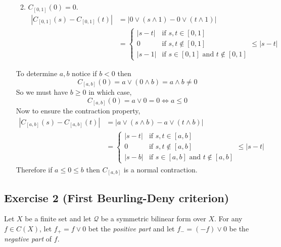 \begin{enumerate}[(a)]
\begin{enumerate}
\begin{equation*}
				\end{equation*}
			\item 
				$C_{[0,1]}(0) = 0$.\\
				\begin{equation*}
					\begin{aligned}
						|C_{[0,1]}(s) - C_{[0,1]}(t)| &= |0\vee(s\wedge 1) - 0\vee(t\wedge 1)|\\
						&=
						\begin{cases}
							|s - t| &\text{if }s,t\in[0,1]\\
							0 &\text{if }s,t\not\in[0,1]\\
							|s - 1| &\text{if }s\in[0,1]\text{ and }t\not\in[0,1]
						\end{cases} \leq |s - t|
					\end{aligned}
				\end{equation*}
		\end{enumerate}
		To determine $a,b$ notice if $b<0$ then
		\begin{equation*}
			C_{[a,b]}(0) = a\vee(0\wedge b) = a\wedge b \neq 0
		\end{equation*}
		So we must have $b\geq 0$ in which case,
		\begin{equation*}
			C_{[a,b]}(0) = a\vee 0 = 0 \iff a\leq 0
		\end{equation*}
		Now to ensure the contraction property,
		\begin{equation*}
			\begin{aligned}
				|C_{[a,b]}(s) - C_{[a,b]}(t)| &= |a\vee(s\wedge b) - a\vee(t\wedge b)|\\
				&= 
				\begin{cases}
					|s - t| &\text{if }s,t\in[a,b]\\
					0 &\text{if }s,t\not\in[a,b]\\
					|s - b| &\text{if }s\in[a,b]\text{ and }t\not\in[a,b]
				\end{cases} \leq |s - t|
			\end{aligned}
		\end{equation*}
		Therefore if $a\leq 0\leq b$ then $C_{[a,b]}$ is a normal contraction.
\end{enumerate}

\subsection{Exercise 2 (First Beurling-Deny criterion)}
Let $X$ be a finite set and let $\mathcal{Q}$ be a symmetric bilinear form over $X$. For any $f\in C(X)$, let $f_{+}=f\vee 0$ bet the \textit{positive part} and let $f_{-}=(-f)\vee 0$ be the \textit{negative part} of $f$.

